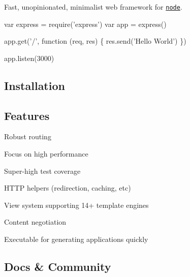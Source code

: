 \href{http://expressjs.com/}{\tt }

Fast, unopinionated, minimalist web framework for \href{http://nodejs.org}{\tt node}.

\href{https://npmjs.org/package/express}{\tt } \href{https://npmjs.org/package/express}{\tt } \href{https://travis-ci.org/expressjs/express}{\tt } \href{https://ci.appveyor.com/project/dougwilson/express}{\tt } \href{https://coveralls.io/r/expressjs/express?branch=master}{\tt }


\begin{DoxyCode}
var express = require('express')
var app = express()

app.get('/', function (req, res) \{
  res.send('Hello World')
\})

app.listen(3000)
\end{DoxyCode}


\subsection*{Installation}




\subsection*{Features}


\begin{DoxyItemize}
\item Robust routing
\item Focus on high performance
\item Super-\/high test coverage
\item H\+T\+TP helpers (redirection, caching, etc)
\item View system supporting 14+ template engines
\item Content negotiation
\item Executable for generating applications quickly
\end{DoxyItemize}

\subsection*{Docs \& Community}


